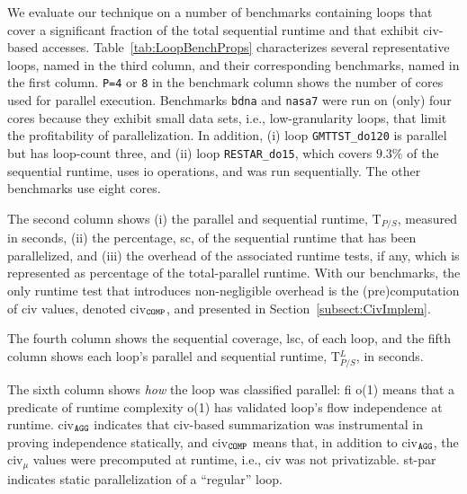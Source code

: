 \documentclass{sig-alternate}
\begin{document}
We evaluate our technique on a number of benchmarks containing loops that cover a significant
fraction of the total sequential runtime and that exhibit {\sc civ}-based accesses.
%
Table~\ref{tab:LoopBenchProps} characterizes several representative loops, named in 
the third column, and their corresponding benchmarks, named in the first column.
{\tt P=4} or {\tt 8} in the benchmark column shows the number of cores used for 
parallel execution. 
%
Benchmarks {\tt bdna} and {\tt nasa7}
were run on (only) four cores because they exhibit small data sets, i.e., low-granularity 
loops, that limit the profitability of parallelization. 
In addition, (i) loop {\tt GMTTST\_do120} 
is parallel but has loop-count three, and (ii) loop {\tt RESTAR\_do15},
which covers $9.3\%$ of the sequential runtime, uses {\sc io} operations,
and was run sequentially. The other benchmarks use eight cores.


The second column shows 
(i)   the parallel and sequential runtime, T$_{P/S}$, measured in seconds,
(ii)  the percentage, {\sc sc}, of the sequential runtime that has been parallelized, and 
(iii) the overhead of the associated runtime tests, if any, which is represented as percentage of
        the total-parallel runtime. With our benchmarks, the only runtime test that introduces
        non-negligible overhead is the (pre)computation of {\sc civ} values, 
        denoted {\sc civ}$_{\tt{}COMP}$, and presented in Section~\ref{subsect:CivImplem}.   

The fourth column shows the sequential coverage, {\sc lsc}, of each loop, and the
fifth column shows each loop's parallel and sequential runtime, T$_{P/S}^L$, in seconds.

The sixth column shows {\em how} the loop was classified parallel: {\sc fi} {\sc o(1)}
means that a predicate of runtime complexity {\sc o(1)} has validated loop's flow
independence at runtime. {\sc civ}$_{\tt{}AGG}$ indicates that {\sc civ}-based summarization 
was instrumental in proving independence statically, and {\sc civ}$_{\tt{}COMP}$ means that,
in addition to {\sc civ}$_{\tt{}AGG}$, the {\sc civ}$_\mu$ values were precomputed
at runtime, i.e., {\sc civ} was not privatizable.  {\sc st-par} indicates static
parallelization of a ``regular'' loop. 
\end{document}
